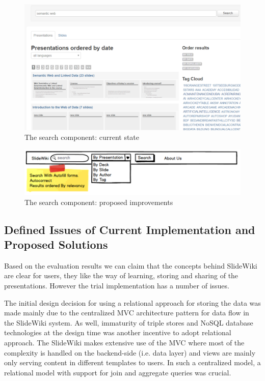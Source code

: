 \documentclass[ngerman,UKenglish,table]{scrbook}
\begin{document}
\begin{figure}[ht!]
	\centering
		\includegraphics[width=\columnwidth]{images/search.png}
	\caption{The search component: current state}
	\label{fig:search_current}
\end{figure}

\begin{figure}[ht!]
	\centering
		\includegraphics[width=\columnwidth]{images/search_mockup.png}
	\caption{The search component: proposed improvements}
	\label{fig:search_mockup}
\end{figure}



\subsection{Defined Issues of Current Implementation and Proposed Solutions}
\label{sec:slidewiki_new_generation}

Based on the evaluation results we can claim that the concepts behind SlideWiki are clear for users, they like the way of learning, storing and sharing of the presentations.
However the trial implementation has a number of issues. 

The initial design decision for using a relational approach for storing the data was made mainly due to the centralized MVC architecture pattern for data flow in the SlideWiki system. 
As well, immaturity of triple stores and NoSQL database technologies at the design time was another incentive to adopt relational approach.
The SlideWiki makes extensive use of the MVC where most of the complexity is handled on the backend-side (i.e. data layer) and views are mainly only serving content in different templates to users.
In such a centralized model, a relational model with support for join and aggregate queries was crucial.
\end{document}
